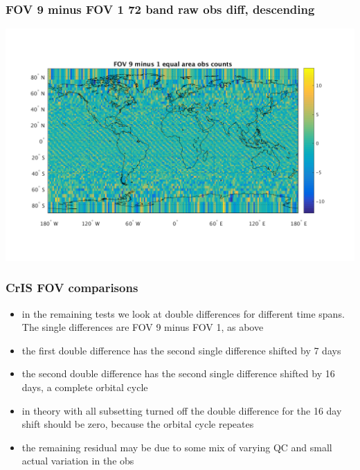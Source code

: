 \documentclass[11pt]{beamer}
\begin{document}
\begin{frame}
\frametitle{FOV 9 minus FOV 1 72 band raw obs diff, descending}
\begin{center}
  \includegraphics[scale=0.5]{slackfigs/FOV_9_minus_1_72_bin_desc.png}
\end{center}
\end{frame} %
\begin{frame}
\frametitle{CrIS FOV comparisons}

\begin{itemize}

  \item in the remaining tests we look at double differences for
    different time spans.  The single differences are FOV 9 minus
    FOV 1, as above 

  \item the first double difference has the second single difference
    shifted by 7 days

  \item the second double difference has the second single difference
    shifted by 16 days, a complete orbital cycle

  \item in theory with all subsetting turned off the double
    difference for the 16 day shift should be zero, because the
    orbital cycle repeates

  \item the remaining residual may be due to some mix of varying QC
    and small actual variation in the obs 

\end{itemize}

\end{frame}
\end{document}

